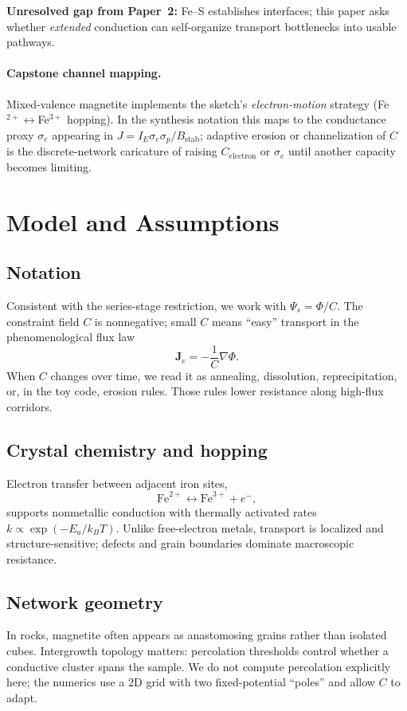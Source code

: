 \documentclass[11pt,a4paper]{article}
\begin{document}
\textbf{Unresolved gap from Paper~2:} Fe--S establishes interfaces; this paper asks whether \emph{extended} conduction can self-organize transport bottlenecks into usable pathways.

\paragraph{Capstone channel mapping.}
Mixed-valence magnetite implements the sketch's \emph{electron-motion} strategy (Fe$^{2+}\leftrightarrow$Fe$^{3+}$ hopping). In the synthesis notation this maps to the conductance proxy $\sigma_e$ appearing in $J=I_E\sigma_e\sigma_p/B_{\mathrm{stab}}$; adaptive erosion or channelization of $C$ is the discrete-network caricature of raising $C_{\mathrm{electron}}$ or $\sigma_e$ until another capacity becomes limiting.

\section{Model and Assumptions}

\subsection{Notation}
Consistent with the series-stage restriction, we work with $\Psi_s=\Phi/C$. The constraint field $C$ is nonnegative; small $C$ means ``easy'' transport in the phenomenological flux law
\begin{equation}
\bm{J}_e = -\frac{1}{C}\nabla\Phi.
\end{equation}
When $C$ changes over time, we read it as annealing, dissolution,
reprecipitation, or, in the toy code, erosion rules. Those rules lower
resistance along high-flux corridors.

\subsection{Crystal chemistry and hopping}
Electron transfer between adjacent iron sites,
\begin{equation}
\text{Fe}^{2+} \leftrightarrow \text{Fe}^{3+} + e^-,
\end{equation}
supports nonmetallic conduction with thermally activated rates $k\propto \exp(-E_a/k_BT)$. Unlike free-electron metals, transport is localized and structure-sensitive; defects and grain boundaries dominate macroscopic resistance.

\subsection{Network geometry}
In rocks, magnetite often appears as anastomosing grains rather than isolated cubes. Intergrowth topology matters: percolation thresholds control whether a conductive cluster spans the sample. We do not compute percolation explicitly here; the numerics use a 2D grid with two fixed-potential ``poles'' and allow $C$ to adapt.
\end{document}

